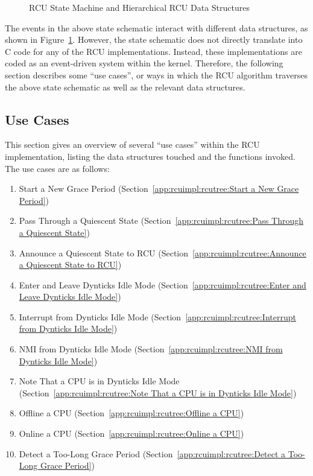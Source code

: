 \begin{figure}[htb]
\centering
{}
\caption{RCU State Machine and Hierarchical RCU Data Structures}
\label{fig:app:rcuimpl:rcutree:RCU State Machine and Hierarchical RCU Data Structures}
\end{figure}

The events in the above state schematic interact with different
data structures, as shown in
Figure~\ref{fig:app:rcuimpl:rcutree:RCU State Machine and Hierarchical RCU Data Structures}.
However, the state schematic does not directly translate into C code
for any of the RCU implementations.
Instead, these implementations are coded as an event-driven system within
the kernel.
Therefore, the following section describes some ``use cases'',
or ways in which the RCU algorithm traverses the above state schematic
as well as the relevant data structures.

\subsection{Use Cases}
\label{app:rcuimpl:rcutree:Use Cases}

This section gives an overview of several ``use cases''
within the RCU implementation, listing the data structures touched
and the functions invoked.
The use cases are as follows:

\begin{enumerate}
\item	Start a New Grace Period
	(Section~\ref{app:rcuimpl:rcutree:Start a New Grace Period})
\item	Pass Through a Quiescent State
	(Section~\ref{app:rcuimpl:rcutree:Pass Through a Quiescent State})
\item	Announce a Quiescent State to RCU
	(Section~\ref{app:rcuimpl:rcutree:Announce a Quiescent State to RCU})
\item	Enter and Leave Dynticks Idle Mode
	(Section~\ref{app:rcuimpl:rcutree:Enter and Leave Dynticks Idle Mode})
\item	Interrupt from Dynticks Idle Mode
	(Section~\ref{app:rcuimpl:rcutree:Interrupt from Dynticks Idle Mode})
\item	NMI from Dynticks Idle Mode
	(Section~\ref{app:rcuimpl:rcutree:NMI from Dynticks Idle Mode})
\item	Note That a CPU is in Dynticks Idle Mode
	(Section~\ref{app:rcuimpl:rcutree:Note That a CPU is in Dynticks Idle Mode})
\item	Offline a CPU
	(Section~\ref{app:rcuimpl:rcutree:Offline a CPU})
\item	Online a CPU
	(Section~\ref{app:rcuimpl:rcutree:Online a CPU})
\item	Detect a Too-Long Grace Period
	(Section~\ref{app:rcuimpl:rcutree:Detect a Too-Long Grace Period})
\end{enumerate}

